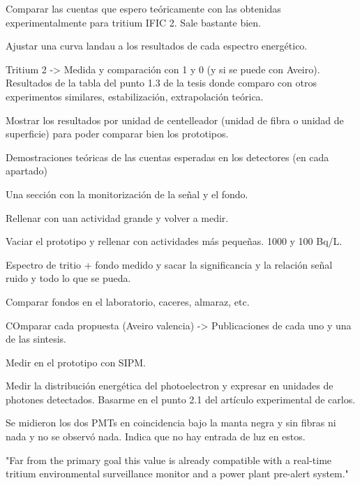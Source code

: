 Comparar las cuentas que espero teóricamente con las obtenidas experimentalmente para tritium IFIC 2. Sale bastante bien.

Ajustar una curva landau a los resultados de cada espectro energético.


Tritium 2 -> Medida y comparación con 1 y 0 (y si se puede con Aveiro). Resultados de la tabla del punto 1.3 de la tesis donde comparo con otros experimentos similares, estabilización, extrapolación teórica.

Mostrar los resultados por unidad de centelleador (unidad de fibra o unidad de superficie) para poder comparar bien los prototipos.

Demostraciones teóricas de las cuentas esperadas en los detectores (en cada apartado)

Una sección con la monitorización de la señal y el fondo.

Rellenar con uan actividad grande y volver a medir. 

Vaciar el prototipo y rellenar con actividades más pequeñas. 1000 y 100 Bq/L.

Espectro de tritio + fondo medido y sacar la significancia y la relación señal ruido y todo lo que se pueda.

Comparar fondos en el laboratorio, caceres, almaraz, etc.

COmparar cada propuesta (Aveiro valencia) -> Publicaciones de cada uno y una de las sintesis.

Medir en el prototipo con SIPM.

Medir la distribución energética del photoelectron y expresar en unidades de photones detectados. Basarme en el punto 2.1 del artículo experimental de carlos.

Se midieron los dos PMTs en coincidencia bajo la manta negra y sin fibras ni nada y no se observó nada. Indica que no hay entrada de luz en estos.

"Far from the primary goal this value is already compatible with a real-time tritium environmental surveillance monitor and a power plant pre-alert system."